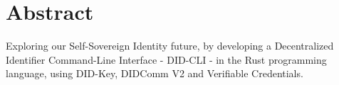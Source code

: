 \chapter*{Abstract}

Exploring our Self-Sovereign Identity future, by developing a Decentralized Identifier Command-Line Interface - DID-CLI - in the Rust programming language, using DID-Key, DIDComm V2 and Verifiable Credentials.